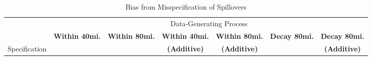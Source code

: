 \documentclass[aspectratio=169]{beamer}
\begin{document}
\begin{frame}

    \begin{table}[!tb]
        \caption{Bias from Misspecification of Spillovers}
        \label{tab:misspecification}
    
        \begin{adjustbox}{width = \textwidth, center}
            \begin{threeparttable}
                \begin{tabular}{@{} l rrrrrr @{}}
                    \toprule
                    & \multicolumn{6}{c}{Data-Generating Process} \\
                    \cmidrule{2-7}
    
                    & \multicolumn{1}{c}{\textbf{Within 40mi.}} & \multicolumn{1}{c}{\textbf{Within 80mi.}} & \multicolumn{1}{c}{\textbf{Within 40mi.}} & \multicolumn{1}{c}{\textbf{Within 80mi.}} & \multicolumn{1}{c}{\textbf{Decay 80mi.}} & \multicolumn{1}{c}{\textbf{Decay 80mi.}} \\
                    Specification & & & \multicolumn{1}{c}{\textbf{(Additive)}} & \multicolumn{1}{c}{\textbf{(Additive)}} & & \multicolumn{1}{c}{\textbf{(Additive)}} \\
    
     
                    \midrule
                    

\end{tabular}
\end{threeparttable}
\end{adjustbox}
\end{table}
\end{frame}
\end{document}
